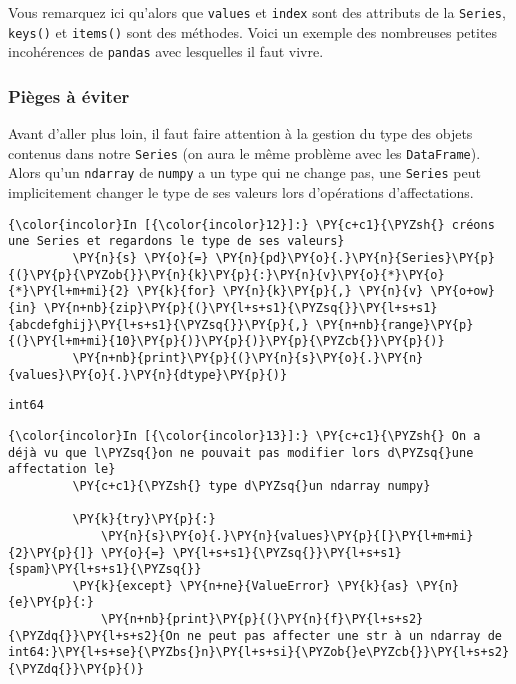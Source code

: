     Vous remarquez ici qu'alors que \texttt{values} et \texttt{index} sont
des attributs de la \texttt{Series}, \texttt{keys()} et \texttt{items()}
sont des méthodes. Voici un exemple des nombreuses petites incohérences
de \texttt{pandas} avec lesquelles il faut vivre.

    \hypertarget{piuxe8ges-uxe0-uxe9viter}{%
\subsubsection{Pièges à éviter}\label{piuxe8ges-uxe0-uxe9viter}}

    Avant d'aller plus loin, il faut faire attention à la gestion du type
des objets contenus dans notre \texttt{Series} (on aura le même problème
avec les \texttt{DataFrame}). Alors qu'un \texttt{ndarray} de
\texttt{numpy} a un type qui ne change pas, une \texttt{Series} peut
implicitement changer le type de ses valeurs lors d'opérations
d'affectations.

    \begin{Verbatim}[commandchars=\\\{\},frame=single,framerule=0.3mm,rulecolor=\color{cellframecolor}]
{\color{incolor}In [{\color{incolor}12}]:} \PY{c+c1}{\PYZsh{} créons une Series et regardons le type de ses valeurs}
         \PY{n}{s} \PY{o}{=} \PY{n}{pd}\PY{o}{.}\PY{n}{Series}\PY{p}{(}\PY{p}{\PYZob{}}\PY{n}{k}\PY{p}{:}\PY{n}{v}\PY{o}{*}\PY{o}{*}\PY{l+m+mi}{2} \PY{k}{for} \PY{n}{k}\PY{p}{,} \PY{n}{v} \PY{o+ow}{in} \PY{n+nb}{zip}\PY{p}{(}\PY{l+s+s1}{\PYZsq{}}\PY{l+s+s1}{abcdefghij}\PY{l+s+s1}{\PYZsq{}}\PY{p}{,} \PY{n+nb}{range}\PY{p}{(}\PY{l+m+mi}{10}\PY{p}{)}\PY{p}{)}\PY{p}{\PYZcb{}}\PY{p}{)}
         \PY{n+nb}{print}\PY{p}{(}\PY{n}{s}\PY{o}{.}\PY{n}{values}\PY{o}{.}\PY{n}{dtype}\PY{p}{)}
\end{Verbatim}


    \begin{Verbatim}[commandchars=\\\{\},frame=single,framerule=0.3mm,rulecolor=\color{cellframecolor}]
int64
\end{Verbatim}

    \begin{Verbatim}[commandchars=\\\{\},frame=single,framerule=0.3mm,rulecolor=\color{cellframecolor}]
{\color{incolor}In [{\color{incolor}13}]:} \PY{c+c1}{\PYZsh{} On a déjà vu que l\PYZsq{}on ne pouvait pas modifier lors d\PYZsq{}une affectation le}
         \PY{c+c1}{\PYZsh{} type d\PYZsq{}un ndarray numpy}
         
         \PY{k}{try}\PY{p}{:}
             \PY{n}{s}\PY{o}{.}\PY{n}{values}\PY{p}{[}\PY{l+m+mi}{2}\PY{p}{]} \PY{o}{=} \PY{l+s+s1}{\PYZsq{}}\PY{l+s+s1}{spam}\PY{l+s+s1}{\PYZsq{}}
         \PY{k}{except} \PY{n+ne}{ValueError} \PY{k}{as} \PY{n}{e}\PY{p}{:}
             \PY{n+nb}{print}\PY{p}{(}\PY{n}{f}\PY{l+s+s2}{\PYZdq{}}\PY{l+s+s2}{On ne peut pas affecter une str à un ndarray de int64:}\PY{l+s+se}{\PYZbs{}n}\PY{l+s+si}{\PYZob{}e\PYZcb{}}\PY{l+s+s2}{\PYZdq{}}\PY{p}{)}
\end{Verbatim}


